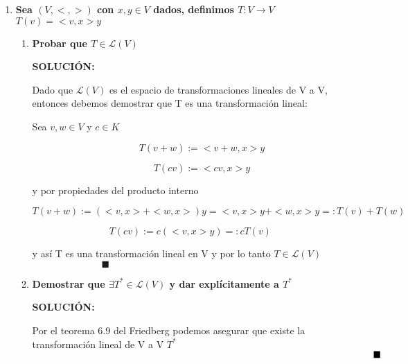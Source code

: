 \documentclass[12pt,a4paper]{article}
\begin{document}
\begin{enumerate}
    \item \textbf{Sea $(V,<,>)$ con $x,y \in V$ dados, definimos $T:V \rightarrow V$  $T(v)=<v,x>y$}
    
    \begin{enumerate}
        \item \textbf{Probar que $T \in \mathcal{L} (V)$}
        
        \textbf{SOLUCIÓN:}
        
        Dado que $\mathcal{L}(V)$ es el espacio de transformaciones lineales de V a V, entonces debemos demostrar que T es una transformación lineal:
        
        Sea $v,w \in  V$ y $c \in K$
        
        \begin{equation*}
            \hspace{1cm} T(v+w) := <v+w,x>y
        \end{equation*}
        
        \begin{equation*}
            \hspace{1cm} T(cv) := <cv,x>y
        \end{equation*}
        
        y por propiedades del producto interno
        
        \begin{equation*}
            T(v+w) := (<v,x> + <w,x>)y = <v,x>y + <w,x>y =: T(v) + T(w)
        \end{equation*}
        
        \begin{equation*}
            T(cv) := c(<v,x>y) =: c T(v)  
        \end{equation*}
        
        y así T es una transformación lineal en V y por lo tanto $T \in \mathcal{L}(V)$ $\hspace{3cm} \blacksquare$
        
        \item \textbf{Demostrar  que $\exists T^{*} \in \mathcal{L}(V)$ y dar explícitamente a $T^{*}$}
        
        \textbf{SOLUCIÓN:}
        
        Por el teorema 6.9 del Friedberg podemos asegurar que existe la transformación lineal de V a V $T^{*}$ $\hspace{12.5cm} \blacksquare$
        

\end{enumerate}
\end{enumerate}
\end{document}
